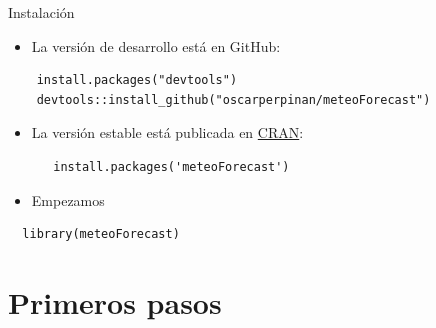 \documentclass[xcolor={usenames,svgnames,dvipsnames}]{beamer}
\begin{document}
\begin{frame}[fragile,label=sec-1-3]{Instalación}
 \begin{itemize}
\item La versión de desarrollo está en GitHub:
\end{itemize}
\lstset{language=R,label= ,caption= ,numbers=none}
\begin{lstlisting}
    install.packages("devtools")
    devtools::install_github("oscarperpinan/meteoForecast")
\end{lstlisting}

\begin{itemize}
\item La versión estable está publicada en \href{http://cran.r-project.org/web/packages/meteoForecast/}{CRAN}:

\lstset{language=R,label= ,caption= ,numbers=none}
\begin{lstlisting}
   install.packages('meteoForecast')
\end{lstlisting}

\item Empezamos
\end{itemize}
\lstset{language=R,label= ,caption= ,numbers=none}
\begin{lstlisting}
  library(meteoForecast)
\end{lstlisting}
\end{frame}


\section{Primeros pasos}
\label{sec-2}
\end{document}

